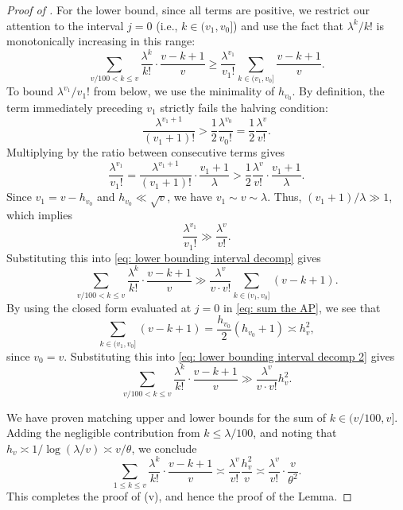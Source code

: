 \documentclass{amsart}
\theoremstyle{definition}
\numberwithin{equation}{section}
\begin{document}
\begin{proof}[Proof of ]
	For the lower bound, since all terms are positive, we restrict our attention to the interval $j=0$ (i.e., $k \in (v_1, v_0]$) and use the fact that $\lambda^k/k!$ is monotonically increasing in this range:
	\begin{equation}\label{eq: lower bounding interval decomp}
		\sum_{v/100 < k \leq v} \frac{\lambda^k}{k!}\cdot \frac{v-k+1}{v} \geq \frac{\lambda^{v_1}}{v_1!} \sum_{k \in (v_1, v_0]} \frac{v-k+1}{v}.
	\end{equation}
	To bound $\lambda^{v_1}/v_1!$ from below, we use the minimality of $h_{v_0}$. By definition, the term immediately preceding $v_1$ strictly fails the halving condition:
	$$ \frac{\lambda^{v_1 + 1}}{(v_1 + 1)!} > \frac{1}{2} \frac{\lambda^{v_0}}{v_0!} = \frac{1}{2} \frac{\lambda^v}{v!}. $$
	Multiplying by the ratio between consecutive terms gives
	$$ \frac{\lambda^{v_1}}{v_1!} = \frac{\lambda^{v_1 + 1}}{(v_1 + 1)!} \cdot \frac{v_1 + 1}{\lambda} > \frac{1}{2} \frac{\lambda^v}{v!} \cdot \frac{v_1 + 1}{\lambda}. $$
	Since $v_1 = v - h_{v_0}$ and $h_{v_0} \ll \sqrt{v}$, we have $v_1 \sim v \sim \lambda$. Thus, $(v_1+1)/\lambda \gg 1$, which implies
	\begin{equation*}
		\frac{\lambda^{v_1}}{v_1!} \gg \frac{\lambda^{v}}{v!}.
	\end{equation*}
	Substituting this into \eqref{eq: lower bounding interval decomp} gives 
	\begin{equation}\label{eq: lower bounding interval decomp 2}
		\sum_{v/100 < k \leq v} \frac{\lambda^k}{k!}\cdot \frac{v-k+1}{v} \gg \frac{\lambda^{v}}{v \cdot v!} \sum_{k \in (v_1, v_0]} (v-k+1).
	\end{equation}
	By using the closed form evaluated at $j=0$ in \eqref{eq: sum the AP}, we see that 
	$$ \sum_{k \in (v_1, v_0]} (v-k+1) = \frac{h_{v_0}}{2}(h_{v_0}+ 1) \asymp h_{v}^2, $$ 
	since $v_0 = v$. Substituting this into \eqref{eq: lower bounding interval decomp 2} gives
	$$ \sum_{v/100 < k \leq v} \frac{\lambda^k}{k!}\cdot \frac{v-k+1}{v} \gg  \frac{\lambda^{v}}{v \cdot v!} h_v^2. $$
	
	We have proven matching upper and lower bounds for the sum of $k \in (v/100,v]$. Adding the negligible contribution from $k \leq \lambda/100$, and noting that $h_v \asymp 1/\log(\lambda/v) \asymp v/\theta$, we conclude
	$$ \sum_{1 \leq k \leq v} \frac{\lambda^k}{k!}\cdot \frac{v-k+1}{v} \asymp \frac{\lambda^v}{v!} \frac{h_v^2}{v} \asymp \frac{\lambda^v}{v!} \cdot \frac{v}{\theta^2}. $$
	This completes the proof of (v), and hence the proof of the Lemma.
\end{proof}
\end{document}
